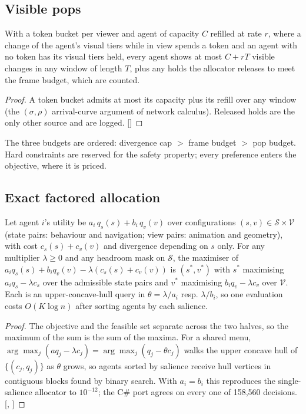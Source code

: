 \subsection{Visible pops}
\begin{theorem}\label{thm:pops}
With a token bucket per viewer and agent of capacity $C$ refilled at rate $r$, where a change of the
agent's visual tiers while in view spends a token and an agent with no token has its visual tiers held,
every agent shows at most $C+rT$ visible changes in any window of length $T$, plus any holds the
allocator releases to meet the frame budget, which are counted.
\end{theorem}
\begin{proof}
A token bucket admits at most its capacity plus its refill over any window (the $(\sigma,\rho)$
arrival-curve argument of network calculus). Released holds are the only other source and are logged.
[]
\end{proof}
The three budgets are ordered: divergence cap $>$ frame budget $>$ pop budget. Hard constraints are
reserved for the safety property; every preference enters the objective, where it is priced.

\subsection{Exact factored allocation}
\begin{theorem}\label{thm:factored}
Let agent $i$'s utility be $a_i\,q_s(s)+b_i\,q_v(v)$ over configurations $(s,v)\in\mathcal{S}\times\mathcal{V}$
(state pairs: behaviour and navigation; view pairs: animation and geometry), with cost
$c_s(s)+c_v(v)$ and divergence depending on $s$ only. For any multiplier $\lambda\ge0$ and any
headroom mask on $\mathcal{S}$, the maximiser of $a_iq_s(s)+b_iq_v(v)-\lambda(c_s(s)+c_v(v))$ is
$(s^*,v^*)$ with $s^*$ maximising $a_iq_s-\lambda c_s$ over the admissible state pairs and $v^*$
maximising $b_iq_v-\lambda c_v$ over $\mathcal{V}$. Each is an upper-concave-hull query in
$\theta=\lambda/a_i$ resp. $\lambda/b_i$, so one evaluation costs $O(K\log n)$ after sorting agents
by each salience.
\end{theorem}
\begin{proof}
The objective and the feasible set separate across the two halves, so the maximum of the sum is the sum of
the maxima. For a shared menu, $\arg\max_j (a q_j-\lambda c_j)=\arg\max_j(q_j-\theta c_j)$ walks the upper
concave hull of $\{(c_j,q_j)\}$ as $\theta$ grows, so agents sorted by salience receive hull vertices
in contiguous blocks found by binary search. With $a_i=b_i$ this reproduces the single-salience
allocator to $10^{-12}$; the C\# port agrees on every one of 158{,}560 decisions.
[, ]
\end{proof}
